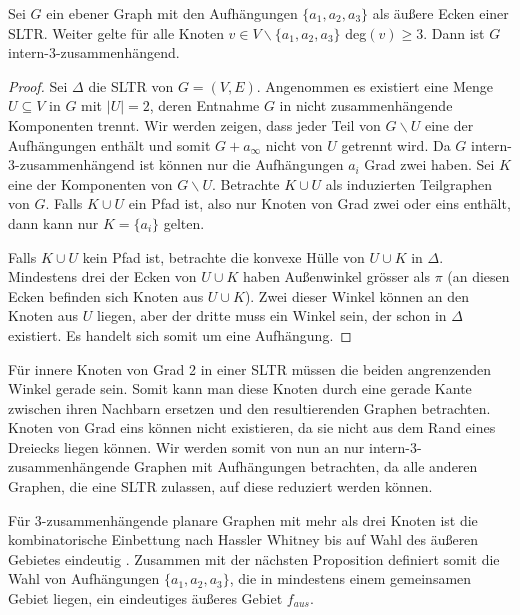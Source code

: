 \begin{proposition}\cite[Proposition 1.2]{af13}
Sei $G$ ein ebener Graph mit den Aufhängungen $\{a_1,a_2,a_3\}$ als äußere Ecken einer SLTR. Weiter gelte für alle Knoten $v\in V \backslash \{a_1,a_2,a_3\}$ deg$(v) \geq 3$. Dann ist $G$ intern-3-zusammenhängend.
\end{proposition}

\begin{proof}
Sei $\Delta$ die SLTR von $G=(V,E)$. Angenommen es existiert eine Menge $U \subseteq V$ in $G$ mit $|U| = 2$, deren Entnahme $G$ in nicht zusammenhängende Komponenten trennt. Wir werden zeigen, dass jeder Teil von $G\backslash U$ eine der Aufhängungen enthält und somit $G + a_\infty$ nicht von $U$ getrennt wird. Da $G$ intern-3-zusammenhängend ist können nur die Aufhängungen $a_i$ Grad zwei haben. Sei $K$ eine der Komponenten von $G\backslash U$. Betrachte $K\cup U$ als induzierten Teilgraphen von $G$. Falls $K\cup U$ ein Pfad ist, also nur Knoten von Grad zwei oder eins enthält, dann kann nur $K=\{a_i\}$ gelten.

Falls $K\cup U$ kein Pfad ist, betrachte die konvexe Hülle von $U \cup K$ in $\Delta$. Mindestens drei der Ecken von $U \cup K$ haben Außenwinkel grösser als $\pi$ (an diesen Ecken befinden sich Knoten aus $U \cup K$). Zwei dieser Winkel können an den Knoten aus $U$ liegen, aber der dritte muss ein Winkel sein, der schon in $\Delta$ existiert. Es handelt sich somit um eine Aufhängung.
\end{proof}

\begin{remark}
Für innere Knoten von Grad 2 in einer SLTR müssen die beiden angrenzenden Winkel gerade sein. Somit kann man diese Knoten durch eine gerade Kante zwischen ihren Nachbarn ersetzen und den resultierenden Graphen betrachten. Knoten von Grad eins können nicht existieren, da sie nicht aus dem Rand eines Dreiecks liegen können. Wir werden somit von nun an nur intern-3-zusammenhängende Graphen mit Aufhängungen betrachten, da alle anderen Graphen, die eine SLTR zulassen, auf diese reduziert werden können.
\end{remark}

Für 3-zusammenhängende planare Graphen mit mehr als drei Knoten ist die kombinatorische Einbettung nach Hassler Whitney bis auf Wahl des äußeren Gebietes eindeutig \cite{whitney32}. Zusammen mit der nächsten Proposition definiert somit die Wahl von Aufhängungen $\{a_1,a_2,a_3\}$, die in mindestens einem gemeinsamen Gebiet liegen, ein eindeutiges äußeres Gebiet $f_{aus}$.


